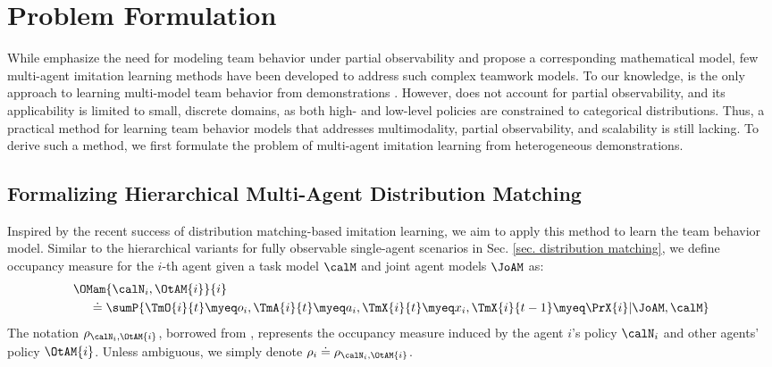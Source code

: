 \section{Problem Formulation}
\label{sec. problem formulation}

While \citet{seo2023automated} emphasize the need for modeling team behavior under partial observability and propose a corresponding mathematical model, few multi-agent imitation learning methods have been developed to address such complex teamwork models. To our knowledge, \btil is the only approach to learning multi-model team behavior from demonstrations \cite{seo2022semi}. However, \btil does not account for partial observability, and its applicability is limited to small, discrete domains, as both high- and low-level policies are constrained to categorical distributions. Thus, a practical method for learning team behavior models that addresses multimodality, partial observability, and scalability is still lacking. To derive such a method, we first formulate the problem of multi-agent imitation learning from heterogeneous demonstrations.

\subsection{Formalizing Hierarchical Multi-Agent Distribution Matching}
\label{sec. problem statement}
Inspired by the recent success of distribution matching-based imitation learning, we aim to apply this method to learn the team behavior model. Similar to the hierarchical variants for fully observable single-agent scenarios in Sec. \ref{sec. distribution matching}, we define \AMoccu occupancy measure for the $i$-th agent given a task model $\calM$ and joint agent models $\JoAM$ as:  
\begin{align*}
    &\OMam{\calN_i, \OtAM{i}}{i} \\
    &\hspace{3ex}\doteq \sumP{\TmO{i}{t}\myeq o_i, \TmA{i}{t}\myeq a_i, \TmX{i}{t}\myeq x_i, \TmX{i}{t-1}\myeq \PrX{i}|\JoAM, \calM}
\end{align*}
The notation $\rho_{\calN_i, \OtAM{i}}$, borrowed from \magail \cite{song2018multi}, represents the occupancy measure induced by the agent $i$'s policy $\calN_i$ and other agents' policy $\OtAM{i}$. 
Unless ambiguous, we simply denote $\rho_{i} \doteq \rho_{\calN_i, \OtAM{i}}$.

